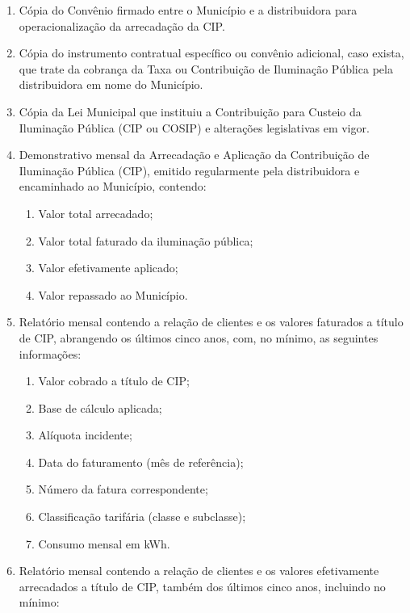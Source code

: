 \begin{enumerate}[resume]
\item Cópia do Convênio firmado entre o Município e a distribuidora para operacionalização da arrecadação da CIP.

\item Cópia do instrumento contratual específico ou convênio adicional, caso exista, que trate da cobrança da Taxa ou Contribuição de Iluminação Pública pela distribuidora em nome do Município.

\item Cópia da Lei Municipal que instituiu a Contribuição para Custeio da Iluminação Pública (CIP ou COSIP) e alterações legislativas em vigor.

\item Demonstrativo mensal da Arrecadação e Aplicação da Contribuição de Iluminação Pública (CIP), emitido regularmente pela distribuidora e encaminhado ao Município, contendo:
\label{item:demonstrativo-cip}

\begin{enumerate}
  \item Valor total arrecadado;
  \item Valor total faturado da iluminação pública;
  \item Valor efetivamente aplicado;
  \item Valor repassado ao Município.
\end{enumerate}

\item Relatório mensal contendo a relação de clientes e os valores faturados a título de CIP, abrangendo os últimos cinco anos, com, no mínimo, as seguintes informações:

\begin{enumerate}
  \item Valor cobrado a título de CIP;
  \item Base de cálculo aplicada;
  \item Alíquota incidente;
  \item Data do faturamento (mês de referência);
  \item Número da fatura correspondente;
  \item Classificação tarifária (classe e subclasse);
  \item Consumo mensal em kWh.
\end{enumerate}

\item Relatório mensal contendo a relação de clientes e os valores efetivamente arrecadados a título de CIP, também dos últimos cinco anos, incluindo no mínimo:


\end{enumerate}
